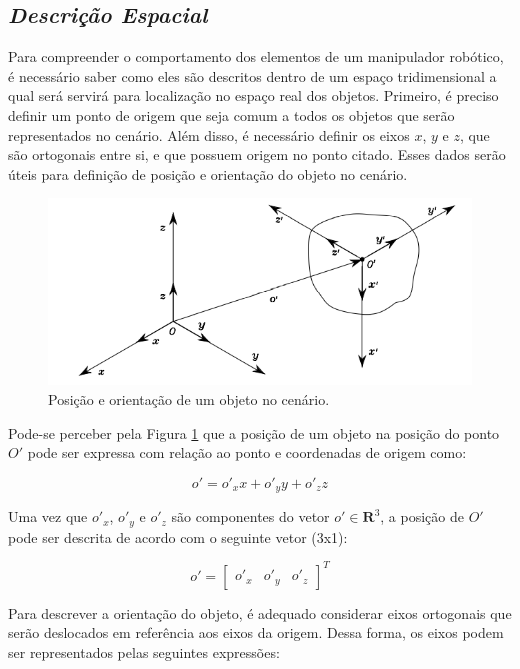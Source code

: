 \subsection{\textit{Descrição Espacial}}\label{sec:Cap3_Espacial}

Para compreender o comportamento dos elementos de um manipulador robótico, é necessário saber como eles são descritos dentro de um espaço tridimensional a qual será servirá para localização no espaço real dos objetos. Primeiro, é preciso definir um ponto de origem que seja comum a todos os objetos que serão representados no cenário. Além disso, é necessário definir os eixos $x$, $y$ e $z$, que são ortogonais entre si, e que possuem origem no ponto citado. Esses dados serão úteis para definição de posição e orientação do objeto no cenário.

\begin{figure}[h!]
\centering
\includegraphics[width=0.7\columnwidth]{Imagens/PosEOri.PNG}
\caption{Posição e orientação de um objeto no cenário. \cite{siciliano2010robotics}}
\label{fig:PoseOri}
\end{figure}

Pode-se perceber pela Figura \ref{fig:PoseOri} que a posição de um objeto na posição do ponto $O'$ pode ser expressa com relação ao ponto e coordenadas de origem como:

\begin{equation}
o' = o'_xx+o'_yy+o'_zz
\label{eq:3_01}
\end{equation}

Uma vez que $o'_x$, $o'_y$ e $o'_z$ são componentes do vetor $o'\in \mathbf{R}^3$, a posição de $O'$ pode ser descrita de acordo com o seguinte vetor (3x1):

\begin{equation}
o' = 
\begin{bmatrix}
o'_x & o'_y & o'_z
\end{bmatrix} ^T
\label{eq:3_02}
\end{equation}

Para descrever a orientação do objeto, é adequado considerar eixos ortogonais que serão deslocados em referência aos eixos da origem. Dessa forma, os eixos podem ser representados pelas seguintes expressões:

